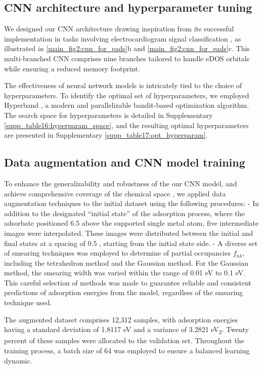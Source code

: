 \subsection{CNN architecture and hyperparameter tuning}
We designed our CNN architecture drawing inspiration from its successful implementation in tasks involving electrocardiogram signal classification \cite{weimann2021transfer}, as illustrated in \cref{main_fig2:cnn_for_eads}b and \cref{main_fig2:cnn_for_eads}c.
This multi-branched CNN comprises nine branches tailored to handle eDOS orbitals while ensuring a reduced memory footprint.

The effectiveness of neural network models is intricately tied to the choice of hyperparameters.
To identify the optimal set of hyperparameters, we employed Hyperband \cite{li2018hyperband}, a modern and parallelizable bandit-based optimization algorithm.
The search space for hyperparameters is detailed in Supplementary \cref{supp_table16:hyperparam_space}, and the resulting optimal hyperparameters are presented in Supplementary \cref{supp_table17:opt_hyperparam}.

\subsection{Data augmentation and CNN model training}
To enhance the generalizability and robustness of the our CNN model, and achieve comprehensive coverage of the chemical space \cite{DBLP:journals/corr/abs-2112-12542}, we applied data augmentation techniques to the initial dataset using the following procedures:
	- In addition to the designated ``initial state'' of the adsorption process, where the adsorbate positioned 6.5 \text{\AA} above the supported single metal atom, five intermediate images were interpolated. These images were distributed between the initial and final states at a spacing of 0.5 \text{\AA}, starting from the initial state side.
	- A diverse set of smearing techniques was employed to determine of partial occupancies $f_{nk}$, including the tetrahedron method \cite{blochl1994improved} and the Gaussian method. For the Gaussian method, the smearing width was varied within the range of 0.01 eV to 0.1 eV. This careful selection of methods was made to guarantee reliable and consistent predictions of adsorption energies from the model, regardless of the smearing technique used.

The augmented dataset comprises 12,312 samples, with adsorption energies having a standard deviation of 1.8117 eV and a variance of 3.2821 eV\textsubscript{2}.
Twenty percent of these samples were allocated to the validation set. Throughout the training process, a batch size of 64 was employed to ensure a balanced learning dynamic.

